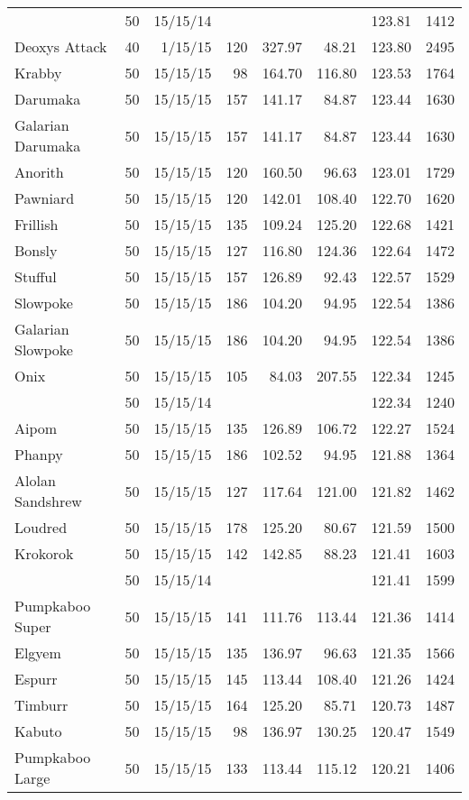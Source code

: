 \begin{longtable}{lrrrrrrr}
 & 50 & 15/15/14 & & & & 123.81 & 1412\\
Deoxys Attack & 40 & 1/15/15 & 120 & 327.97 & 48.21 & 123.80 & 2495\\
Krabby & 50 & 15/15/15 & 98 & 164.70 & 116.80 & 123.53 & 1764\\
Darumaka & 50 & 15/15/15 & 157 & 141.17 & 84.87 & 123.44 & 1630\\
Galarian Darumaka & 50 & 15/15/15 & 157 & 141.17 & 84.87 & 123.44 & 1630\\
Anorith & 50 & 15/15/15 & 120 & 160.50 & 96.63 & 123.01 & 1729\\
Pawniard & 50 & 15/15/15 & 120 & 142.01 & 108.40 & 122.70 & 1620\\
Frillish & 50 & 15/15/15 & 135 & 109.24 & 125.20 & 122.68 & 1421\\
Bonsly & 50 & 15/15/15 & 127 & 116.80 & 124.36 & 122.64 & 1472\\
Stufful & 50 & 15/15/15 & 157 & 126.89 & 92.43 & 122.57 & 1529\\
Slowpoke & 50 & 15/15/15 & 186 & 104.20 & 94.95 & 122.54 & 1386\\
Galarian Slowpoke & 50 & 15/15/15 & 186 & 104.20 & 94.95 & 122.54 & 1386\\
Onix & 50 & 15/15/15 & 105 & 84.03 & 207.55 & 122.34 & 1245\\
 & 50 & 15/15/14 & & & & 122.34 & 1240\\
Aipom & 50 & 15/15/15 & 135 & 126.89 & 106.72 & 122.27 & 1524\\
Phanpy & 50 & 15/15/15 & 186 & 102.52 & 94.95 & 121.88 & 1364\\
Alolan Sandshrew & 50 & 15/15/15 & 127 & 117.64 & 121.00 & 121.82 & 1462\\
Loudred & 50 & 15/15/15 & 178 & 125.20 & 80.67 & 121.59 & 1500\\
Krokorok & 50 & 15/15/15 & 142 & 142.85 & 88.23 & 121.41 & 1603\\
 & 50 & 15/15/14 & & & & 121.41 & 1599\\
Pumpkaboo Super & 50 & 15/15/15 & 141 & 111.76 & 113.44 & 121.36 & 1414\\
Elgyem & 50 & 15/15/15 & 135 & 136.97 & 96.63 & 121.35 & 1566\\
Espurr & 50 & 15/15/15 & 145 & 113.44 & 108.40 & 121.26 & 1424\\
Timburr & 50 & 15/15/15 & 164 & 125.20 & 85.71 & 120.73 & 1487\\
Kabuto & 50 & 15/15/15 & 98 & 136.97 & 130.25 & 120.47 & 1549\\
Pumpkaboo Large & 50 & 15/15/15 & 133 & 113.44 & 115.12 & 120.21 & 1406\\

\end{longtable}
